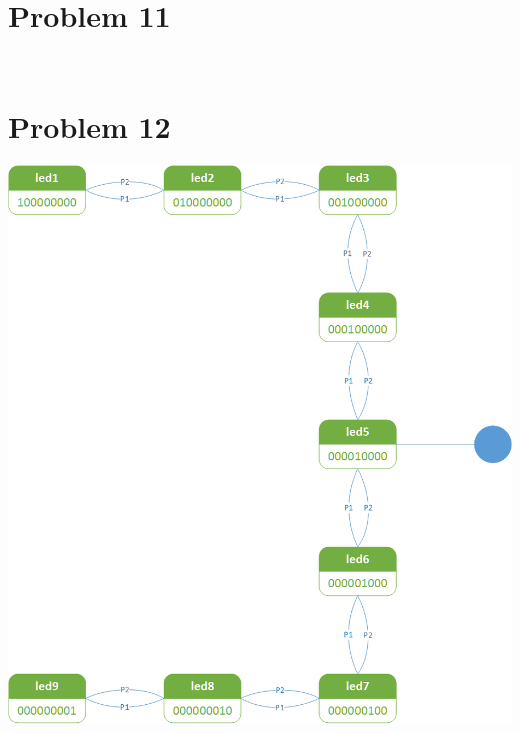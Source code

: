 \documentclass[paper=a4, fontsize=11pt]{scrartcl} %
\numberwithin{equation}{section} %
\numberwithin{figure}{section} %
\numberwithin{table}{section} %
\begin{document}

\section{Problem 11}
\inputminted{vhdl}{src/p11/p11-in.vhd}
\inputminted{vhdl}{src/p11/p11-out.vhd}


\section{Problem 12}
\center\includegraphics[]{p12.png}
\inputminted{vhdl}{src/p12/p12.vhd}
\inputminted{vhdl}{src/p12/p12_t.vhd}
\end{document}

